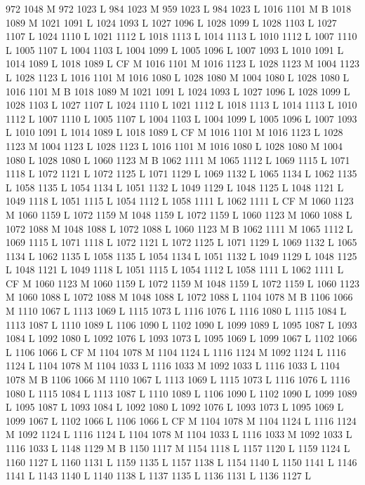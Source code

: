 {{{{{{{{{{{{{{{{{{972 1048 M 972 1023 L
984 1023 M 959 1023 L
984 1023 L
1016 1101 M B
1018 1089 M 1021 1091 L
1024 1093 L
1027 1096 L
1028 1099 L
1028 1103 L
1027 1107 L
1024 1110 L
1021 1112 L
1018 1113 L
1014 1113 L
1010 1112 L
1007 1110 L
1005 1107 L
1004 1103 L
1004 1099 L
1005 1096 L
1007 1093 L
1010 1091 L
1014 1089 L
1018 1089 L
CF M
1016 1101 M 1016 1123 L
1028 1123 M 1004 1123 L
1028 1123 L
1016 1101 M 1016 1080 L
1028 1080 M 1004 1080 L
1028 1080 L
1016 1101 M B
1018 1089 M 1021 1091 L
1024 1093 L
1027 1096 L
1028 1099 L
1028 1103 L
1027 1107 L
1024 1110 L
1021 1112 L
1018 1113 L
1014 1113 L
1010 1112 L
1007 1110 L
1005 1107 L
1004 1103 L
1004 1099 L
1005 1096 L
1007 1093 L
1010 1091 L
1014 1089 L
1018 1089 L
CF M
1016 1101 M 1016 1123 L
1028 1123 M 1004 1123 L
1028 1123 L
1016 1101 M 1016 1080 L
1028 1080 M 1004 1080 L
1028 1080 L
1060 1123 M B
1062 1111 M 1065 1112 L
1069 1115 L
1071 1118 L
1072 1121 L
1072 1125 L
1071 1129 L
1069 1132 L
1065 1134 L
1062 1135 L
1058 1135 L
1054 1134 L
1051 1132 L
1049 1129 L
1048 1125 L
1048 1121 L
1049 1118 L
1051 1115 L
1054 1112 L
1058 1111 L
1062 1111 L
CF M
1060 1123 M 1060 1159 L
1072 1159 M 1048 1159 L
1072 1159 L
1060 1123 M 1060 1088 L
1072 1088 M 1048 1088 L
1072 1088 L
1060 1123 M B
1062 1111 M 1065 1112 L
1069 1115 L
1071 1118 L
1072 1121 L
1072 1125 L
1071 1129 L
1069 1132 L
1065 1134 L
1062 1135 L
1058 1135 L
1054 1134 L
1051 1132 L
1049 1129 L
1048 1125 L
1048 1121 L
1049 1118 L
1051 1115 L
1054 1112 L
1058 1111 L
1062 1111 L
CF M
1060 1123 M 1060 1159 L
1072 1159 M 1048 1159 L
1072 1159 L
1060 1123 M 1060 1088 L
1072 1088 M 1048 1088 L
1072 1088 L
1104 1078 M B
1106 1066 M 1110 1067 L
1113 1069 L
1115 1073 L
1116 1076 L
1116 1080 L
1115 1084 L
1113 1087 L
1110 1089 L
1106 1090 L
1102 1090 L
1099 1089 L
1095 1087 L
1093 1084 L
1092 1080 L
1092 1076 L
1093 1073 L
1095 1069 L
1099 1067 L
1102 1066 L
1106 1066 L
CF M
1104 1078 M 1104 1124 L
1116 1124 M 1092 1124 L
1116 1124 L
1104 1078 M 1104 1033 L
1116 1033 M 1092 1033 L
1116 1033 L
1104 1078 M B
1106 1066 M 1110 1067 L
1113 1069 L
1115 1073 L
1116 1076 L
1116 1080 L
1115 1084 L
1113 1087 L
1110 1089 L
1106 1090 L
1102 1090 L
1099 1089 L
1095 1087 L
1093 1084 L
1092 1080 L
1092 1076 L
1093 1073 L
1095 1069 L
1099 1067 L
1102 1066 L
1106 1066 L
CF M
1104 1078 M 1104 1124 L
1116 1124 M 1092 1124 L
1116 1124 L
1104 1078 M 1104 1033 L
1116 1033 M 1092 1033 L
1116 1033 L
1148 1129 M B
1150 1117 M 1154 1118 L
1157 1120 L
1159 1124 L
1160 1127 L
1160 1131 L
1159 1135 L
1157 1138 L
1154 1140 L
1150 1141 L
1146 1141 L
1143 1140 L
1140 1138 L
1137 1135 L
1136 1131 L
1136 1127 L
}}}}}}}}}}}}}}}}}}
